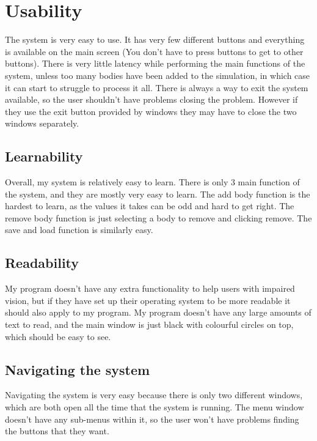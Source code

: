 \section{Usability}
The system is very easy to use. It has very few different buttons and everything
is available on the main screen (You don't have to press buttons to get to other
buttons). There is very little latency while performing the main functions of
the system, unless too many bodies have been added to the simulation, in which
case it can start to struggle to process it all. There is always a way to exit
the system available, so the user shouldn't have problems closing the problem.
However if they use the exit button provided by windows they may have to close
the two windows separately.
\subsection{Learnability}
Overall, my system is relatively easy to learn. There is only 3 main function of
the system, and they are mostly very easy to learn. The add body function is the
hardest to learn, as the values it takes can be odd and hard to get right. The
remove body function is just selecting a body to remove and clicking remove. The
save and load function is similarly easy.
%
\subsection{Readability}
My program doesn't have any extra functionality to help users with impaired
vision, but if they have set up their operating system to be more readable it
should also apply to my program. My program doesn't have any large amounts of
text to read, and the main window is just black with colourful circles on top,
which should be easy to see.

\subsection{Navigating the system}
Navigating the system is very easy because there is only two different windows,
which are both open all the time that the system is running. The menu window
doesn't have any sub-menus within it, so the user won't have problems finding
the buttons that they want.

